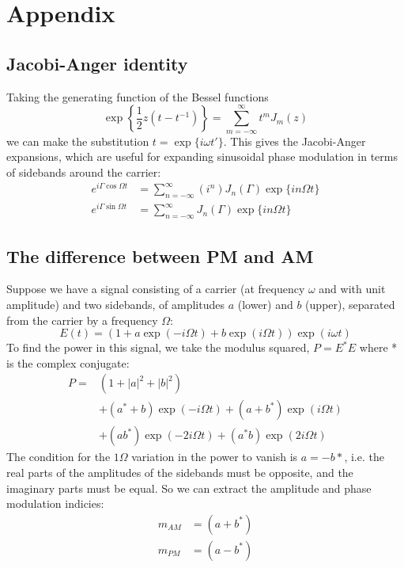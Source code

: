 \chapter{Appendix}
\label{chapter7}
\section{Jacobi-Anger identity}
\label{sec:jacobi-anger}
Taking the generating function of the Bessel functions
\begin{equation}
\exp\left\{\frac{1}{2} z \left(t - t^{-1}\right)\right\} = \sum_{m=-\infty}^\infty t^m J_m(z)
\end{equation}
we can make the substitution $t = \exp \{i \omega t'\}$.
This gives the Jacobi-Anger expansions, which are useful for expanding sinusoidal phase modulation in terms of sidebands around the carrier:
\begin{align}
e^{i\Gamma\cos\Omega t} & = \sum_{n=-\infty}^{\infty} \left(i^n\right)  J_n(\Gamma) \exp\{i n \Omega t\} \\
e^{i\Gamma\sin\Omega t} & = \sum_{n=-\infty}^{\infty} J_n(\Gamma) \exp\{i n \Omega t\}
\end{align}


\section{The difference between PM and AM}
\label{sec:am-vs-pm}
%
Suppose we have a signal consisting of a carrier (at frequency $\omega$ and
with unit amplitude) and two sidebands, of amplitudes $a$ (lower) and $b$
(upper), separated from the carrier by a frequency $\Omega$:
%
\begin{equation}
E(t) = \left(1 + a \exp(-i \Omega t) + b \exp(i \Omega t)\right)
\exp(i \omega t)
\end{equation}
%
To find the power in this signal, we take the
modulus squared, $P = E^*E$ where * is the complex conjugate:
%
\begin{equation}
\begin{split}
P = & \left(1 + |a|^2 + |b|^2\right) \\
    & + \left(a^* + b\right) \exp(-i \Omega t) + \left(a + b^*\right) \exp(i \Omega t) \\
    & + \left(ab^*\right) \exp(-2 i \Omega t) + \left(a^*b\right) \exp(2 i \Omega t)
\end{split}
\end{equation}
%
The condition for the $1\Omega$ variation in the power to vanish is
$a=-b*$, i.e. the real parts of the amplitudes of the sidebands must
be opposite, and the imaginary parts must be equal. So we can extract
the amplitude and phase modulation indicies:
%
\begin{equation}
\begin{split}
m_{AM} &= (a + b^*)\\
m_{PM} &= (a - b^*)
\end{split}
\end{equation}

